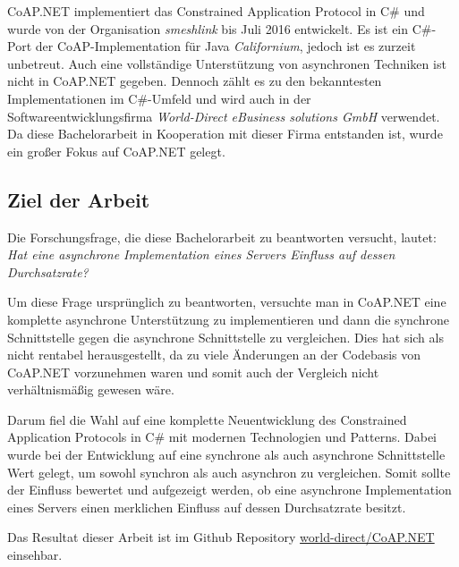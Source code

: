 CoAP.NET implementiert das Constrained Application Protocol in C\# und wurde von der Organisation \textit{smeshlink} bis Juli 2016 entwickelt. Es ist ein C\#-Port der CoAP-Implementation für Java \textit{Californium}, jedoch ist es zurzeit unbetreut. Auch eine vollständige Unterstützung von asynchronen Techniken ist nicht in CoAP.NET gegeben. Dennoch zählt es zu den bekanntesten Implementationen im C\#-Umfeld und wird auch in der Softwareentwicklungsfirma \textit{World-Direct eBusiness solutions GmbH} verwendet. Da diese Bachelorarbeit in Kooperation mit dieser Firma entstanden ist, wurde ein großer Fokus auf CoAP.NET gelegt.

\subsection{Ziel der Arbeit}
\label{subsec:ziel-der-arbeit}

Die Forschungsfrage, die diese Bachelorarbeit zu beantworten versucht, lautet: \textit{Hat eine asynchrone Implementation eines Servers Einfluss auf dessen Durchsatzrate?}

Um diese Frage ursprünglich zu beantworten, versuchte man in CoAP.NET eine komplette asynchrone Unterstützung zu implementieren und dann die synchrone Schnittstelle gegen die asynchrone Schnittstelle zu vergleichen. Dies hat sich als nicht rentabel herausgestellt, da zu viele Änderungen an der Codebasis von CoAP.NET vorzunehmen waren und somit auch der Vergleich nicht verhältnismäßig gewesen wäre.

Darum fiel die Wahl auf eine komplette Neuentwicklung des Constrained Application Protocols in C\# mit modernen Technologien und Patterns. Dabei wurde bei der Entwicklung auf eine synchrone als auch asynchrone Schnittstelle Wert gelegt, um sowohl synchron als auch asynchron zu vergleichen. Somit sollte der Einfluss bewertet und aufgezeigt werden, ob eine asynchrone Implementation eines Servers einen merklichen Einfluss auf dessen Durchsatzrate besitzt.

Das Resultat dieser Arbeit ist im Github Repository \href{https://github.com/world-direct/CoAP.NET}{world-direct/CoAP.NET} einsehbar.